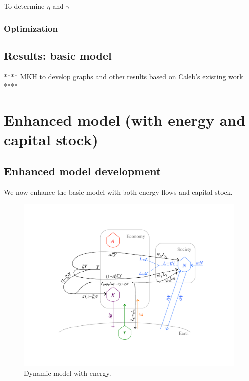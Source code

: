 \documentclass[letterpaper,12pt]{article}
\begin{document}
To determine $\eta$ and $\gamma$

\subsubsection{Optimization}




\subsection{Results: basic model}
\label{sec:Results_basic_model}

**** MKH to develop graphs and other results based on Caleb's existing work ****


\section{Enhanced model (with energy and capital stock)}
\label{sec:Enhanced_model}

\subsection{Enhanced model development}
\label{sec:Enhanced_model_development}

We now enhance the basic model with both energy flows and capital stock.

\begin{figure} \label{fig:ModelWithEnergy}
  \begin{center}
    \includegraphics[width=\textwidth]{figure_other/ModelWithEnergy.pdf}
    \caption{Dynamic model with energy.}
  \end{center}
\end{figure}
\end{document}
